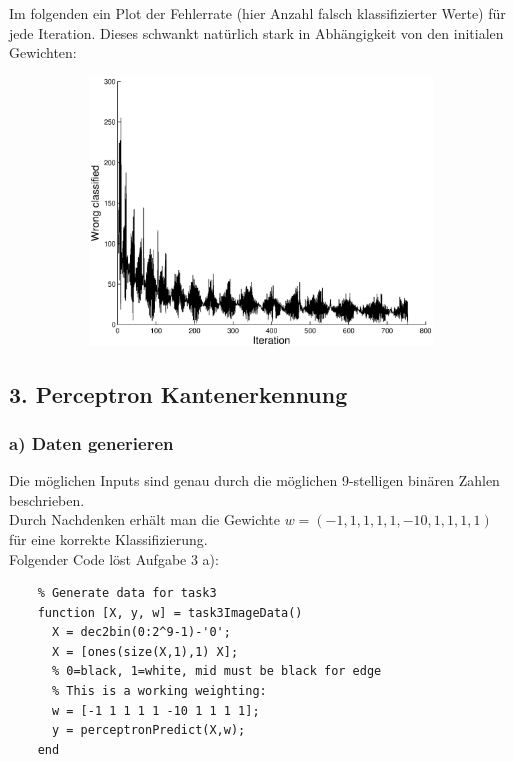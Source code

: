 \documentclass{article}
\begin{document}
	Im folgenden ein Plot der Fehlerrate (hier Anzahl falsch klassifizierter Werte) für jede Iteration. Dieses schwankt natürlich stark in Abhängigkeit von den initialen Gewichten:
	\begin{figure}[H]
	  \begin{subfigure}
	    \centering
	    \includegraphics[scale=0.75]{task2-perceptron.eps}
	  \end{subfigure}
	\end{figure}

\subsection*{3. Perceptron Kantenerkennung}
	
	\subsubsection*{a) Daten generieren}
	
	Die möglichen Inputs sind genau durch die möglichen 9-stelligen binären Zahlen beschrieben.\\
	Durch Nachdenken erhält man die Gewichte $w = (-1, 1, 1, 1, 1, -10, 1, 1, 1, 1)$ für eine korrekte Klassifizierung.\\
	
	Folgender Code löst Aufgabe 3 a):
	\begin{lstlisting}
	% Generate data for task3
	function [X, y, w] = task3ImageData()
	  X = dec2bin(0:2^9-1)-'0';
	  X = [ones(size(X,1),1) X];
	  % 0=black, 1=white, mid must be black for edge
	  % This is a working weighting:
	  w = [-1 1 1 1 1 -10 1 1 1 1];
	  y = perceptronPredict(X,w);
	end
	\end{lstlisting}
	
\end{document}
